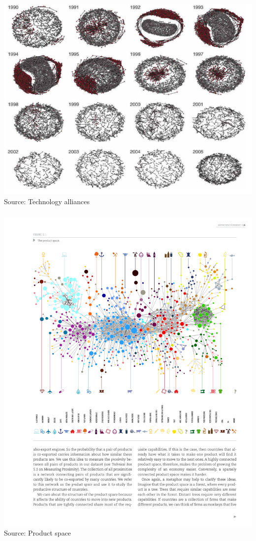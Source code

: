 \documentclass[8pt]{beamer}
\begin{document}
 
\begin{frame}
\frametitle{\insertsection}
\centering
\includegraphics[width=\linewidth,height=0.8\textheight,keepaspectratio]{alliances}\\
\tiny Source: Technology alliances \cite{Schilling2015}
\end{frame}


\begin{frame}
\frametitle{\insertsection}
\centering
\includegraphics[width=\linewidth,height=0.8\textheight,keepaspectratio]{hidalgo}\\
\tiny Source: Product space \cite{Hausmann2013}
\end{frame}
\end{document}
